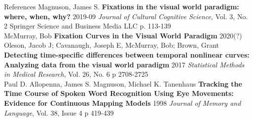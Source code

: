 \documentclass{beamer}
\begin{document}
%
%
%




\begin{frame}{References}
Magnuson, James S. \textbf{Fixations in the visual world paradigm: where, when, why?} 2019-09 \textit{Journal of Cultural Cognitive Science}, Vol. 3, No. 2 Springer  Science and Business Media LLC p. 113-139 \newline \\

McMurray, Bob \textbf{Fixation Curves in the Visual World Paradigm} 2020(?) \newline \\

Oleson, Jacob J; Cavanaugh, Joseph E, McMurray, Bob; Brown, Grant \textbf{Detecting time-specific differences between temporal nonlinear curves: Analyzing data from the visual world paradigm} 2017 \textit{Statistical Methods in Medical Research}, Vol. 26, No. 6 p 2708-2725 \newline \\

Paul D. Allopenna, James S. Magnuson, Michael K. Tanenhaus
\textbf{Tracking the Time Course of Spoken Word Recognition Using Eye Movements: Evidence for Continuous Mapping Models} 1998 \textit{Journal of Memory and Language}, Vol. 38, Issue 4 p 419-439


\end{frame}
\end{document}
